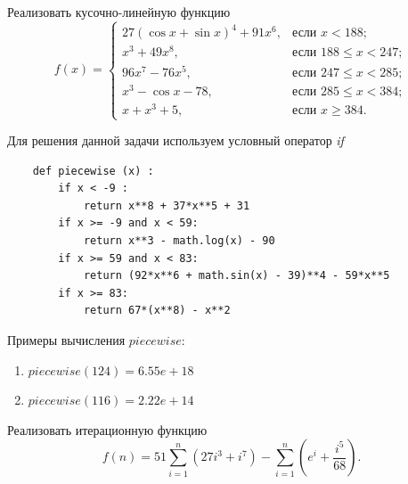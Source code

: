\documentclass[a4paper,14pt]{extarticle}
\begin{document}
\begin{problem} Реализовать кусочно-линейную функцию
	\[
	f(x) = 
		\begin{cases}
			27\left(\cos x + \sin x\right)^4 + 91x^6,&\text{если }x < 188;\\
			x^3 + 49x^8,& \text{если }188\le x < 247;\\
			96x^7 -76x^5,& \text{если }247 \le x < 285;\\
			x^3 - \cos x -78,& \text{если }285 \le x < 384;\\
			x + x^3 + 5,& \text{если } x \ge 384.
		\end{cases}
	\]
\end{problem}
\newpage
\begin{nonum}
	Для решения данной задачи используем условный оператор \textit {if}	
	\begin{lstlisting}
	def piecewise (x) :
		if x < -9 :
			return x**8 + 37*x**5 + 31
		if x >= -9 and x < 59:
			return x**3 - math.log(x) - 90
		if x >= 59 and x < 83:
			return (92*x**6 + math.sin(x) - 39)**4 - 59*x**5
		if x >= 83:
			return 67*(x**8) - x**2
	\end{lstlisting}
		
Примеры вычисления $piecewise:$
\begin{enumerate}
	\item $piecewise(124) =  6.55e+18$
	\item $piecewise(116) = 2.22e+14$
\end{enumerate}	
\end{nonum}

\begin{problem}
	Реализовать итерационную функцию
	\[
		f(n)= 51 \sum_{i=1}^{n} \left(27i^3+i^7\right) - \sum_{i=1}^{n} \left(e^i+\frac{i^5}{68}\right).
	\]
\end{problem}
\end{document}
